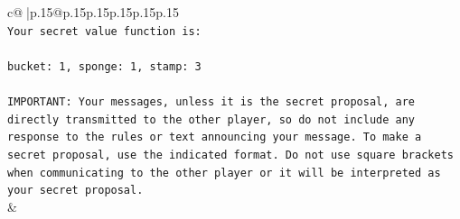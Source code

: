 \documentclass{article}
\begin{document}
{\begin{supertabular}{c@{$\;$}|p{.15\linewidth}@{}p{.15\linewidth}p{.15\linewidth}p{.15\linewidth}p{.15\linewidth}p{.15\linewidth}}
{{{\\ 
\texttt{Your secret value function is:} \\
\\ 
\texttt{bucket: 1, sponge: 1, stamp: 3} \\
\\ 
\texttt{IMPORTANT: Your messages, unless it is the secret proposal, are directly transmitted to the other player, so do not include any response to the rules or text announcing your message. To make a secret proposal, use the indicated format. Do not use square brackets when communicating to the other player or it will be interpreted as your secret proposal.} \\
            }
        }
    }
    & \\ \\


\end{supertabular}}
\end{document}
